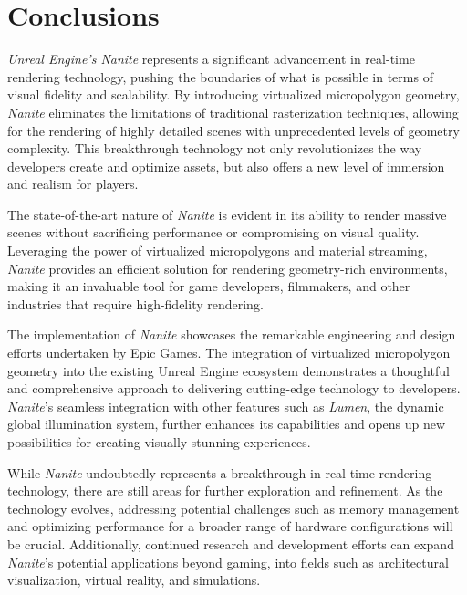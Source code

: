\documentclass[10pt,journal,compsoc]{IEEEtran}
\begin{document}

\section{Conclusions}\label{sec:7}

\par \textit{Unreal Engine's Nanite} represents a significant advancement in real-time rendering technology, pushing the boundaries of what is possible in terms of visual fidelity and scalability. By introducing virtualized micropolygon geometry, \textit{Nanite} eliminates the limitations of traditional rasterization techniques, allowing for the rendering of highly detailed scenes with unprecedented levels of geometry complexity. This breakthrough technology not only revolutionizes the way developers create and optimize assets, but also offers a new level of immersion and realism for players.

\par The state-of-the-art nature of \textit{Nanite} is evident in its ability to render massive scenes without sacrificing performance or compromising on visual quality. Leveraging the power of virtualized micropolygons and material streaming, \textit{Nanite} provides an efficient solution for rendering geometry-rich environments, making it an invaluable tool for game developers, filmmakers, and other industries that require high-fidelity rendering.

\par The implementation of \textit{Nanite} showcases the remarkable engineering and design efforts undertaken by Epic Games. The integration of virtualized micropolygon geometry into the existing Unreal Engine ecosystem demonstrates a thoughtful and comprehensive approach to delivering cutting-edge technology to developers. \textit{Nanite}'s seamless integration with other features such as \textit{Lumen}, the dynamic global illumination system, further enhances its capabilities and opens up new possibilities for creating visually stunning experiences.

\par While \textit{Nanite} undoubtedly represents a breakthrough in real-time rendering technology, there are still areas for further exploration and refinement. As the technology evolves, addressing potential challenges such as memory management and optimizing performance for a broader range of hardware configurations will be crucial. Additionally, continued research and development efforts can expand \textit{Nanite}'s potential applications beyond gaming, into fields such as architectural visualization, virtual reality, and simulations.
\end{document}
